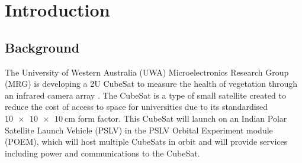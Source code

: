 \documentclass{report}
\begin{document}

\newpage
\tableofcontents
\newpage



\renewcommand{\listfigurename}{
  \section*{List of Figures}
}
\listoffigures
\cleardoublepage
\renewcommand{\listtablename}{
  \section*{List of Tables}
}
\listoftables
\cleardoublepage

\chapter{Introduction}
\section{Background}

The University of Western Australia (UWA) Microelectronics Research Group (MRG) is developing a 2U CubeSat to measure the health of vegetation through an infrared camera array \cite{ludovico2024}. The CubeSat is a type of small satellite created to reduce the cost of access to space for universities due to its standardised $\SI{10x10x10}{\centi\metre}$ form factor. This CubeSat will launch on an Indian Polar Satellite Launch Vehicle (PSLV) in the PSLV Orbital Experiment module (POEM), which will host multiple CubeSats in orbit and will provide services including power and communications to the CubeSat.
\end{document}
